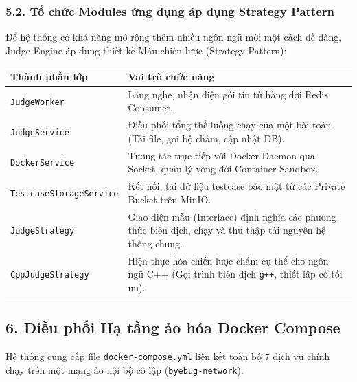 \documentclass[12pt,a4paper]{article}
\renewcommand{\_}{\BreakableUnderscore}
\begin{document}
\subsubsection{5.2. Tổ chức Modules ứng dụng áp dụng Strategy Pattern}

Để hệ thống có khả năng mở rộng thêm nhiều ngôn ngữ mới một cách dễ dàng, Judge Engine áp dụng thiết kế Mẫu chiến lược (Strategy Pattern):

\begin{longtable}[]{
  |>{\raggedright\arraybackslash}p{}
  |>{\raggedright\arraybackslash}p{}|}
\hline\rowcolor{tableHeader}
\begin{minipage}[b]{\linewidth}\raggedright
Thành phần lớp
\end{minipage} & \begin{minipage}[b]{\linewidth}\raggedright
Vai trò chức năng
\end{minipage} \\
\hline
\endhead
\hline
\endlastfoot
\texttt{JudgeWorker} & Lắng nghe, nhận diện gói tin từ hàng đợi Redis Consumer. \\
\hline
\texttt{JudgeService} & Điều phối tổng thể luồng chạy của một bài toán (Tải file, gọi bộ chấm, cập nhật DB). \\
\hline
\texttt{DockerService} & Tương tác trực tiếp với Docker Daemon qua Socket, quản lý vòng đời Container Sandbox. \\
\hline
\texttt{TestcaseStorageService} & Kết nối, tải dữ liệu testcase bảo mật từ các Private Bucket trên MinIO. \\
\hline
\texttt{JudgeStrategy} & Giao diện mẫu (Interface) định nghĩa các phương thức biên dịch, chạy và thu thập tài nguyên hệ thống chung. \\
\hline
\texttt{CppJudgeStrategy} & Hiện thực hóa chiến lược chấm cụ thể cho ngôn ngữ C++ (Gọi trình biên dịch \texttt{g++}, thiết lập cờ tối ưu). \\
\hline
\end{longtable}

\subsection{6. Điều phối Hạ tầng ảo hóa Docker Compose}

Hệ thống cung cấp file \texttt{docker-compose.yml} liên kết toàn bộ 7 dịch vụ chính chạy trên một mạng ảo nội bộ cô lập (\texttt{byebug-network}).
\end{document}
